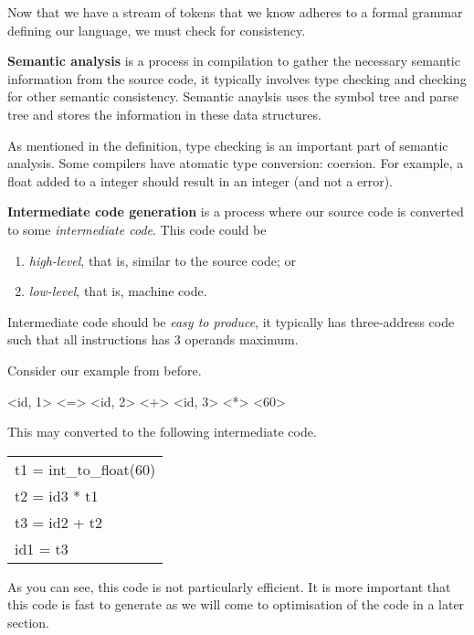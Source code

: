 Now that we have a stream of tokens that we know adheres to a formal grammar defining our
language, we must check for consistency.

\begin{definition}
    \textbf{Semantic analysis} is a process in compilation to gather the necessary
    semantic information from the source code, it typically involves type checking
    and checking for other semantic consistency.
    Semantic anaylsis uses the symbol tree and parse tree and stores the information
    in these data structures.
\end{definition}

\begin{remark}
    As mentioned in the definition, 
    type checking is an important part of semantic analysis.
    Some compilers have atomatic type conversion: coersion. 
    For example, a float added to a integer should result in an integer 
    (and not a error).
\end{remark}

\begin{definition}
    \textbf{Intermediate code generation} is a process where our source code
    is converted to some \emph{intermediate code}. This code could be 
    \begin{enumerate}
        \item \emph{high-level}, that is, similar to the source code; or
        \item \emph{low-level}, that is, machine code.
    \end{enumerate}
\end{definition}

Intermediate code should be \emph{easy to produce}, 
it typically has three-address code such that all instructions has
3 operands maximum. 

\begin{example}
    Consider our example from before.
    \begin{center}
        \ttfamily
        <id, 1> <=> <id, 2> <+> <id, 3> <*> <60>
    \end{center}
    This may converted to the following intermediate code.
    \begin{center}
        \ttfamily
        \begin{tabular}{l}
            \toprule
            t1 = int\_to\_float(60) \\
            t2 = id3 * t1 \\
            t3 = id2 + t2 \\
            id1 = t3 \\
            \bottomrule
        \end{tabular}
    \end{center}
    As you can see, this code is not particularly efficient.
    It is more important that this code is fast to generate
    as we will come to optimisation of the code in a later section.
\end{example}

